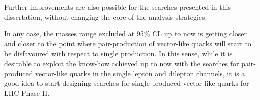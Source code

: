 Further improvements are also possible for the searches
presented in this dissertation, without changing the core of
the analysis strategies. 



In any case, the masses range excluded at 95\% CL up to now
is getting closer and closer to the point where pair-production
of vector-like quarks will start to be disfavoured with respect
to single production. In this sense, while it is desirable to
exploit the know-how achieved up to now with the searches for
pair-produced vector-like quarks in the single lepton and dilepton
channels, it is a good idea to start designing searches for
single-produced vector-like quarks for LHC Phase-II.
